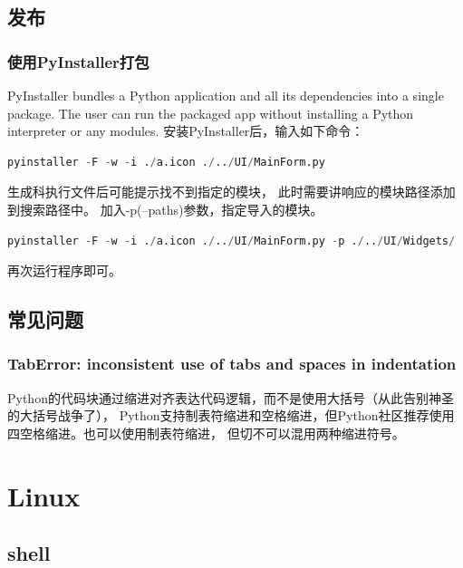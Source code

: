 \documentclass{book}
\begin{document}
\section{发布}

\subsection{使用PyInstaller打包}

PyInstaller bundles a Python application and all its dependencies into a single package. 
The user can run the packaged app without installing a Python interpreter or any modules.
安装PyInstaller后，输入如下命令：

\begin{lstlisting}[language=Python]
pyinstaller -F -w -i ./a.icon ./../UI/MainForm.py
\end{lstlisting}

生成科执行文件后可能提示找不到指定的模块，
此时需要讲响应的模块路径添加到搜索路径中。
加入-p(--paths)参数，指定导入的模块。

\begin{lstlisting}[language=Python]
pyinstaller -F -w -i ./a.icon ./../UI/MainForm.py -p ./../UI/Widgets/
\end{lstlisting}

再次运行程序即可。

\section{常见问题}

\subsection{TabError: inconsistent use of tabs and spaces in indentation}

Python的代码块通过缩进对齐表达代码逻辑，而不是使用大括号（从此告别神圣的大括号战争了），
Python支持制表符缩进和空格缩进，但Python社区推荐使用四空格缩进。也可以使用制表符缩进，
但切不可以混用两种缩进符号。



\chapter{Linux}

\section{shell}
\end{document}
